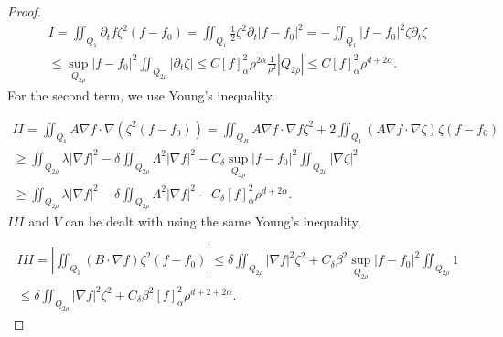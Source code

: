 \documentclass[reqno,12pt,twoside]{amsart}
\numberwithin{equation}{section} \numberwithin{theorem}{section}
\numberwithin{proposition}{section} \numberwithin{lemma}{section}
\numberwithin{corollary}{section}
\numberwithin{definition}{section} \numberwithin{remark}{section}
\begin{document}
\begin{proof}
\begin{multline}\label{Caccio I}
I = \iint_{Q_1} \partial_t f \zeta^2 (f-f_0) = \iint_{Q_1} \frac{1}{2} \zeta^2 \partial_t |f-f_0|^2= - \iint_{Q_1} |f-f_0|^2 \zeta \partial_t \zeta  \\
\leqslant \sup_{Q_{2\rho}} |f-f_0|^2 \iint_{Q_{2\rho}} |\partial_t \zeta| \leqslant C[f]_\alpha^2 \rho^{2\alpha} \frac{1}{\rho^2} |Q_{2\rho}| \leqslant C[f]_\alpha^2 \rho^{d+2\alpha}. 
\end{multline}
For the second term, we use Young's inequality. 

\begin{multline}\label{Caccio II}
II = \iint_{Q_1} A \nabla f\cdot \nabla (\zeta^2(f-f_0)) =  \iint_{Q_R} A \nabla f\cdot \nabla f \zeta^2 + 2 \iint_{Q_1} (A \nabla f \cdot \nabla \zeta) \zeta (f-f_0) \\
\geqslant \iint_{Q_{2\rho}} \lambda |\nabla f|^2 - \delta \iint_{Q_{2\rho}} \Lambda^2 |\nabla f|^2 - C_\delta \sup_{Q_{2\rho}} |f-f_0|^2 \iint_{Q_{2\rho}} |\nabla \zeta|^2\\
\geqslant  \iint_{Q_{2\rho}} \lambda |\nabla f|^2 - \delta \iint_{Q_{2\rho}} \Lambda^2 |\nabla f|^2 - C_\delta [f]_\alpha^2 \rho^{d+2\alpha}. 
\end{multline}
$III$ and $V$ can be dealt with using the same Young's inequality,

\begin{multline}\label{Caccio III}
III = \left|\iint_{Q_1}( B \cdot \nabla f) \zeta^2(f-f_0)\right| \leqslant \delta \iint_{Q_{2\rho}} |\nabla f|^2 \zeta^2 + C_\delta \beta^2 \sup_{Q_{2\rho}} |f-f_0|^2 \iint_{Q_{2\rho}} 1\\
\leqslant \delta \iint_{Q_{2\rho}} |\nabla f|^2 \zeta^2 + C_\delta \beta^2 [f]_\alpha^2 \rho^{d+2+2\alpha}.
\end{multline}


\end{proof}
\end{document}
